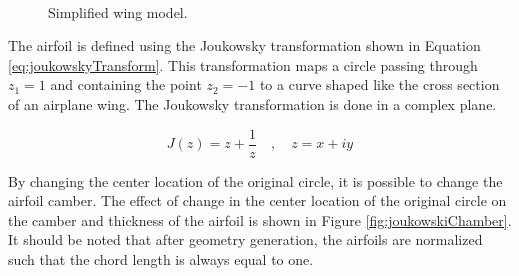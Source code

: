\documentclass[12pt]{aiaa-pretty}
\begin{document}
%
\begin{figure}[H]
	\centering
	\\
	\caption{Simplified wing model.}
	\label{fig:wingModel}
\end{figure}
%

The airfoil is defined using the Joukowsky transformation shown in Equation \eqref{eq:joukowskyTransform}. This transformation maps a circle passing through $z_1 = 1$ and containing the point $z_2 = -1$ to a curve shaped like the cross section of an airplane wing. The Joukowsky transformation is done in a complex plane.

%
\begin{equation}\label{eq:joukowskyTransform}
J(z) = z + \frac{1}{z} \quad , \quad z = x + iy
\end{equation}
%

By changing the center location of the original circle, it is possible to change the airfoil camber. The effect of change in the center location of the original circle on the camber and thickness of the airfoil is shown in Figure \ref{fig:joukowskiChamber}. It should be noted that after geometry generation, the airfoils are normalized such that the chord length is always equal to one.\\
\end{document}
